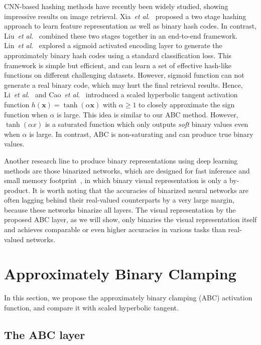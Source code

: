 \documentclass[runningheads]{llncs}
\newcommand{\etal}{\textit{et al}.}
\begin{document}
CNN-based hashing methods have recently been widely studied, showing impressive results on image retrieval. Xia~\etal~\cite{Xia14AAAI_r11} proposed a two stage hashing approach to learn feature representation as well as binary hash codes. In contrast, Liu~\etal~\cite{Liu16CVPR_r12} combined these two stages together in an end-to-end framework. Lin~\etal~\cite{Lin15CVPRW_r13} explored a sigmoid activated encoding layer to generate the approximately binary hash codes using a standard classification loss. This framework is simple but efficient, and can learn a set of effective hash-like functions on different challenging datasets. However, sigmoid function can not generate a real binary code, which may hurt the final retrieval results. Hence, Li~\etal~\cite{Li17ACMMM_r14} and Cao~\etal~\cite{Cao17ICCV_r15} introduced a scaled hyperbolic tangent activation function $h(\mathbf{x})=\tanh(\alpha \mathbf{x})$ with $\alpha \ge 1$ to closely approximate the sign function when $\alpha$ is large. This idea is similar to our ABC method. However, $\tanh(\alpha x)$ is a saturated function which only outputs \emph{soft} binary values even when $\alpha$ is large. In contrast, ABC is non-saturating and can produce true binary values.

Another research line to produce binary representations using deep learning methods are those binarized networks, which are designed for fast inference and small memory footprint~\cite{Courbariaux15NIPS,Hubara16NIPS_Binary,Rastegari16ECCV,Li17ICCV}, in which binary visual representation is only a by-product. It is worth noting that the accuracies of binarized neural networks are often lagging behind their real-valued counterparts by a very large margin, because these networks binarize all layers. The visual representation by the proposed ABC layer, as we will show, only binaries the visual representation itself and achieves comparable or even higher accuracies in various tasks than real-valued networks.

\section{Approximately Binary Clamping}

In this section, we propose the approximately binary clamping (ABC) activation function, and compare it with scaled hyperbolic tangent.

\subsection{The ABC layer}
\end{document}
